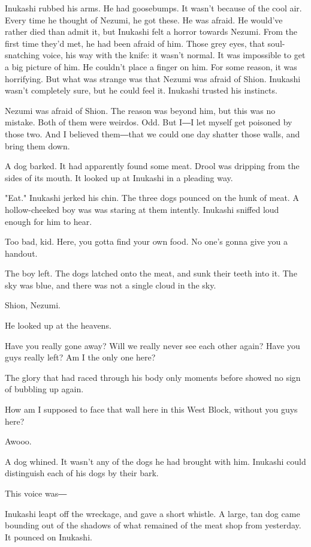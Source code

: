 Inukashi rubbed his arms. He had goosebumps. It wasn't because of the
cool air. Every time he thought of Nezumi, he got these. He was afraid.
He would've rather died than admit it, but Inukashi felt a horror
towards Nezumi. From the first time they'd met, he had been afraid of
him. Those grey eyes, that soul-snatching voice, his way with the knife:
it wasn't normal. It was impossible to get a big picture of him. He
couldn't place a finger on him. For some reason, it was horrifying. But
what was strange was that Nezumi was afraid of Shion. Inukashi wasn't
completely sure, but he could feel it. Inukashi trusted his instincts.

Nezumi was afraid of Shion. The reason was beyond him, but this was no
mistake. Both of them were weirdos. Odd. But I―I let myself get poisoned
by those two. And I believed them―that we could one day shatter those
walls, and bring them down.

A dog barked. It had apparently found some meat. Drool was dripping from
the sides of its mouth. It looked up at Inukashi in a pleading way.

"Eat." Inukashi jerked his chin. The three dogs pounced on the hunk of
meat. A hollow-cheeked boy was was staring at them intently. Inukashi
sniffed loud enough for him to hear.

Too bad, kid. Here, you gotta find your own food. No one's gonna give
you a handout.

The boy left. The dogs latched onto the meat, and sunk their teeth into
it. The sky was blue, and there was not a single cloud in the sky.

Shion, Nezumi.

He looked up at the heavens.

Have you really gone away? Will we really never see each other again?
Have you guys really left? Am I the only one here?

The glory that had raced through his body only moments before showed no
sign of bubbling up again.

How am I supposed to face that wall here in this West Block, without you
guys here?

Awooo.

A dog whined. It wasn't any of the dogs he had brought with him.
Inukashi could distinguish each of his dogs by their bark.

This voice was―

Inukashi leapt off the wreckage, and gave a short whistle. A large, tan
dog came bounding out of the shadows of what remained of the meat shop
from yesterday. It pounced on Inukashi.

